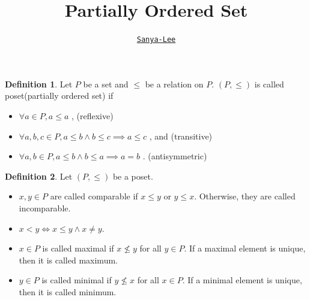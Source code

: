 \documentclass[11pt]{article}
\title{Partially Ordered Set}
\author{\tt \href{https://github.com/Sanya-Lee/}{Sanya-Lee}}
\theoremstyle{definition}
\newtheorem{definition}{Definition}
\begin{document}
	\maketitle
	\begin{definition}
		Let $P$ be a set and $\leq$ be a relation on $P$.
		$(P, \leq)$ is called poset(partially ordered set) if
		\begin{itemize}
			\item $\forall a \in P , a \leq a$  , \hfill (reflexive)
			\item $\forall a, b, c \in P , a \leq b \land b \leq c \implies a \leq c$  , and \hfill (transitive)
			\item $\forall a, b \in P, a \leq b \land b \leq a \implies a = b$  . \hfill (antisymmetric)
		\end{itemize}
	\end{definition}
	
	\begin{definition}
		Let $(P, \leq)$ be a poset.
		\begin{itemize}
			\item $x, y \in P$ are called comparable if $x \leq y$ or $y \leq x$. 
			Otherwise, they are called incomparable.
			\item $x < y \iff x \leq y \land x \neq y$.
			\item $x \in P$ is called maximal if $x \not\leq y$ for all $y \in P$.
			If a maximal element is unique, then it is called maximum.
			\item $y \in P$ is called minimal if $y \not\leq x$ for all $x \in P$.
			If a minimal element is unique, then it is called minimum.
		\end{itemize}
	\end{definition}
	
\end{document}
